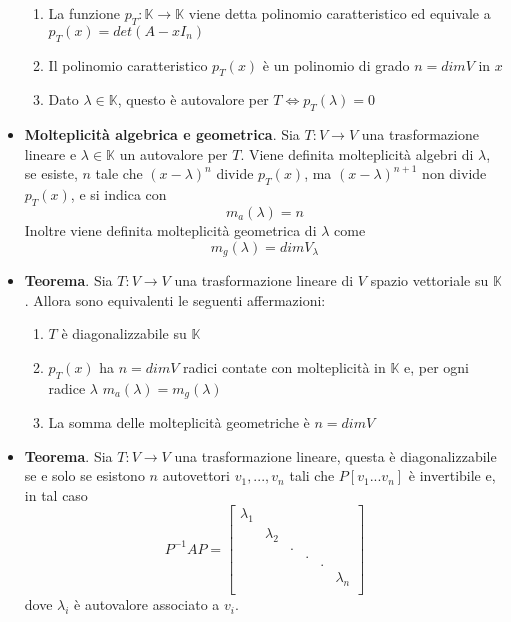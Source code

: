 \documentclass[12pt,a4paper,oneside]{book}
\begin{document}
\begin{itemize}
	  \begin{enumerate}
	  \item La funzione $p_T:\mathbb{K} \rightarrow \mathbb{K}$ viene detta polinomio caratteristico ed
	    	equivale a $p_T(x) = det(A-xI_n)$
	  \item Il polinomio caratteristico $p_T(x)$ è un polinomio di grado $n=dimV$ in $x$
	  \item Dato $\lambda\in\mathbb{K}$, questo è autovalore per $T \Leftrightarrow p_T(\lambda)=0$
	  \end{enumerate}
	
\item \textbf{Molteplicità algebrica e geometrica}. \linebreak
	  Sia $T:V\rightarrow V$ una trasformazione lineare e $\lambda\in\mathbb{K}$ un autovalore per $T$.
	  Viene definita molteplicità algebri di $\lambda$, se esiste, $n$ tale che $(x-\lambda)^n$ divide 
	  $p_T(x)$, ma $(x-\lambda)^{n+1}$ non divide $p_T(x)$, e si indica con $$m_a(\lambda) = n$$
	  Inoltre viene definita molteplicità geometrica di $\lambda$ come $$m_g(\lambda) = dimV_{\lambda}$$
	
\item \textbf{Teorema}. \linebreak
	  Sia $T:V\rightarrow V$ una trasformazione lineare di $V$ spazio vettoriale su $\mathbb{K}$. Allora 
	  sono equivalenti le seguenti affermazioni:
	  
	  \begin{enumerate}
	  \item $T$ è diagonalizzabile su $\mathbb{K}$
	  \item $p_T(x)$ ha $n = dimV$ radici contate con molteplicità in $\mathbb{K}$ e, per ogni radice $
	  		\lambda$ $m_a(\lambda) = m_g(\lambda)$
	  \item La somma delle molteplicità geometriche è $n = dimV$
	  \end{enumerate}
	
\item \textbf{Teorema}. \linebreak
	  Sia $T:V\rightarrow V$ una trasformazione lineare, questa è diagonalizzabile se e solo se esistono $n
	  $ autovettori $v_1, ..., v_n$ tali che $P[v_1 ... v_n]$ è invertibile e, in tal caso $$P^{-1}AP =
	  \begin{bmatrix}
	  \lambda_1 \\
	    & \lambda_2\\
	    &   &  .\\
	    &   &   &   .\\
	    &   &   &   &   .\\
	    &   &   &   &   & \lambda_n \\
	  \end{bmatrix}$$
	  dove $\lambda_i$ è autovalore associato a $v_i$.

\end{itemize}
\end{document}
